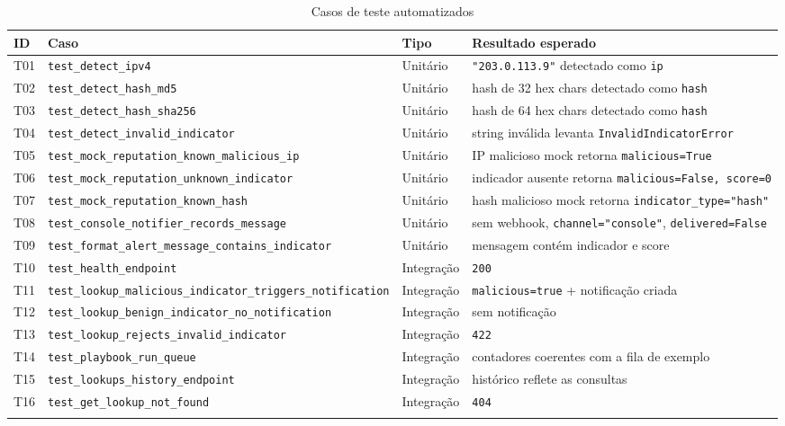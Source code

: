\documentclass[11pt,a4paper]{article}
\begin{document}
\begin{longtable}{p{1.2cm}p{5.8cm}p{2.2cm}p{4.9cm}}
\toprule
\textbf{ID} & \textbf{Caso} & \textbf{Tipo} & \textbf{Resultado esperado} \\
\midrule
\endhead
T01 & \texttt{test\_detect\_ipv4} & Unitário & \texttt{"203.0.113.9"} detectado como \texttt{ip} \\
T02 & \texttt{test\_detect\_hash\_md5} & Unitário & hash de 32 hex chars detectado como \texttt{hash} \\
T03 & \texttt{test\_detect\_hash\_sha256} & Unitário & hash de 64 hex chars detectado como \texttt{hash} \\
T04 & \texttt{test\_detect\_invalid\_indicator} & Unitário & string inválida levanta \texttt{InvalidIndicatorError} \\
T05 & \texttt{test\_mock\_reputation\_known\_malicious\_ip} & Unitário & IP malicioso mock retorna \texttt{malicious=True} \\
T06 & \texttt{test\_mock\_reputation\_unknown\_indicator} & Unitário & indicador ausente retorna \texttt{malicious=False, score=0} \\
T07 & \texttt{test\_mock\_reputation\_known\_hash} & Unitário & hash malicioso mock retorna \texttt{indicator\_type="hash"} \\
T08 & \texttt{test\_console\_notifier\_records\_message} & Unitário & sem webhook, \texttt{channel="console"}, \texttt{delivered=False} \\
T09 & \texttt{test\_format\_alert\_message\_contains\_indicator} & Unitário & mensagem contém indicador e score \\
T10 & \texttt{test\_health\_endpoint} & Integração & \texttt{200} \\
T11 & \texttt{test\_lookup\_malicious\_indicator\_triggers\_notification} & Integração & \texttt{malicious=true} + notificação criada \\
T12 & \texttt{test\_lookup\_benign\_indicator\_no\_notification} & Integração & sem notificação \\
T13 & \texttt{test\_lookup\_rejects\_invalid\_indicator} & Integração & \texttt{422} \\
T14 & \texttt{test\_playbook\_run\_queue} & Integração & contadores coerentes com a fila de exemplo \\
T15 & \texttt{test\_lookups\_history\_endpoint} & Integração & histórico reflete as consultas \\
T16 & \texttt{test\_get\_lookup\_not\_found} & Integração & \texttt{404} \\
\bottomrule
\caption{Casos de teste automatizados}
\end{longtable}
\end{document}
